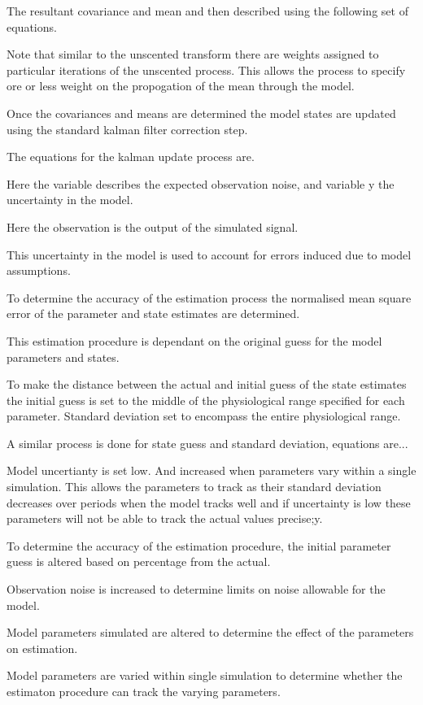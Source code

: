 The resultant covariance and mean and then described using the following set of equations.

Note that similar to the unscented transform there are weights assigned to particular iterations of the unscented process. This allows the process to specify ore or less weight on the propogation of the mean through the model.

Once the covariances and means are determined the model states are updated using the standard kalman filter correction step. 

The equations for the kalman update process are.

Here the variable describes the expected observation noise, and variable y the uncertainty in the model.

Here the observation is the output of the simulated signal.

This uncertainty in the model is used to account for errors induced due to model assumptions.

To determine the accuracy of the estimation process the normalised mean square error of the parameter and state estimates are determined.

This estimation procedure is dependant on the original guess for the model parameters and states.

To make the distance between the actual and initial guess of the state estimates the initial guess is set to the middle of the physiological range specified for each parameter. Standard deviation set to encompass the entire physiological range.

A similar process is done for state guess and standard deviation, equations are...

Model uncertianty is set low. And increased when parameters vary within a single simulation. This allows the parameters to track as their standard deviation decreases over periods when the model tracks well and if uncertainty is low these parameters will not be able to track the actual values precise;y.

To determine the accuracy of the estimation procedure, the initial parameter guess is altered based on percentage from the actual.

Observation noise is increased to determine limits on noise allowable for the model.

Model parameters simulated are altered to determine the effect of the parameters on estimation.

Model parameters are varied within single simulation to determine whether the estimaton procedure can track the varying parameters.



